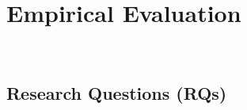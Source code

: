 \section{Empirical Evaluation}~\label{sec:evaluation}

\subsection{Research Questions (RQs)}~\label{subsec:RQs}
